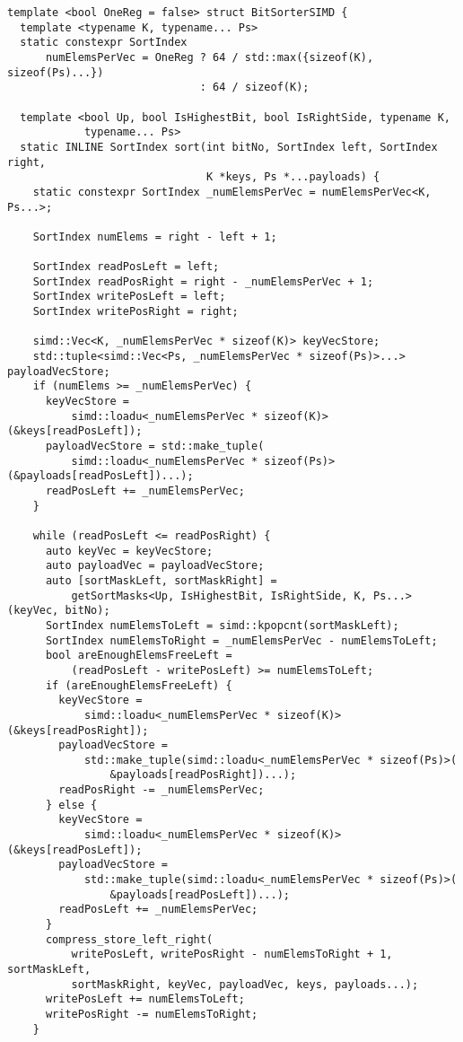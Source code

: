 \documentclass[12pt, a4paper, openright, twoside]{tiarbeit}
\begin{document}
\begin{verbatim}
template <bool OneReg = false> struct BitSorterSIMD {
  template <typename K, typename... Ps>
  static constexpr SortIndex
      numElemsPerVec = OneReg ? 64 / std::max({sizeof(K), sizeof(Ps)...})
                              : 64 / sizeof(K);

  template <bool Up, bool IsHighestBit, bool IsRightSide, typename K,
            typename... Ps>
  static INLINE SortIndex sort(int bitNo, SortIndex left, SortIndex right,
                               K *keys, Ps *...payloads) {
    static constexpr SortIndex _numElemsPerVec = numElemsPerVec<K, Ps...>;

    SortIndex numElems = right - left + 1;

    SortIndex readPosLeft = left;
    SortIndex readPosRight = right - _numElemsPerVec + 1;
    SortIndex writePosLeft = left;
    SortIndex writePosRight = right;

    simd::Vec<K, _numElemsPerVec * sizeof(K)> keyVecStore;
    std::tuple<simd::Vec<Ps, _numElemsPerVec * sizeof(Ps)>...> payloadVecStore;
    if (numElems >= _numElemsPerVec) {
      keyVecStore =
          simd::loadu<_numElemsPerVec * sizeof(K)>(&keys[readPosLeft]);
      payloadVecStore = std::make_tuple(
          simd::loadu<_numElemsPerVec * sizeof(Ps)>(&payloads[readPosLeft])...);
      readPosLeft += _numElemsPerVec;
    }

    while (readPosLeft <= readPosRight) {
      auto keyVec = keyVecStore;
      auto payloadVec = payloadVecStore;
      auto [sortMaskLeft, sortMaskRight] =
          getSortMasks<Up, IsHighestBit, IsRightSide, K, Ps...>(keyVec, bitNo);
      SortIndex numElemsToLeft = simd::kpopcnt(sortMaskLeft);
      SortIndex numElemsToRight = _numElemsPerVec - numElemsToLeft;
      bool areEnoughElemsFreeLeft =
          (readPosLeft - writePosLeft) >= numElemsToLeft;
      if (areEnoughElemsFreeLeft) {
        keyVecStore =
            simd::loadu<_numElemsPerVec * sizeof(K)>(&keys[readPosRight]);
        payloadVecStore =
            std::make_tuple(simd::loadu<_numElemsPerVec * sizeof(Ps)>(
                &payloads[readPosRight])...);
        readPosRight -= _numElemsPerVec;
      } else {
        keyVecStore =
            simd::loadu<_numElemsPerVec * sizeof(K)>(&keys[readPosLeft]);
        payloadVecStore =
            std::make_tuple(simd::loadu<_numElemsPerVec * sizeof(Ps)>(
                &payloads[readPosLeft])...);
        readPosLeft += _numElemsPerVec;
      }
      compress_store_left_right(
          writePosLeft, writePosRight - numElemsToRight + 1, sortMaskLeft,
          sortMaskRight, keyVec, payloadVec, keys, payloads...);
      writePosLeft += numElemsToLeft;
      writePosRight -= numElemsToRight;
    }


\end{verbatim}
\end{document}
